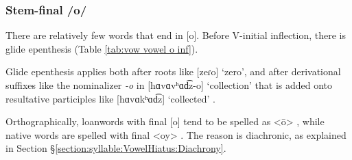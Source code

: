 {	\subsubsection{Stem-final /o/}\label{section:syllable:VowelHiatus:Inf:O}
	
	There are relatively few words that end in [o]. Before V-initial inflection, there is glide epenthesis (Table \ref{tab:vow vowel o inf}). 
	
	\begin{table}[H]
		\centering
		\caption{Glide epenthesis between /o/ and V-initial inflection}
		\label{tab:vow vowel o inf}
		\end{table}
	
	Glide epenthesis applies both after roots like [zeɾo] `zero', and after derivational suffixes like the nominalizer \textit{-o} in [hɑvɑvʰɑd͡z-o] `collection' that is added onto resultative participles like [hɑvɑkʰɑd͡z] `collected' . 
	
	
	Orthographically, loanwords with final [o] tend to be spelled as <ō> , while native words are spelled with final <oy> . The reason is diachronic, as   explained in Section \S\ref{section:syllable:VowelHiatus:Diachrony}. 
	
}

